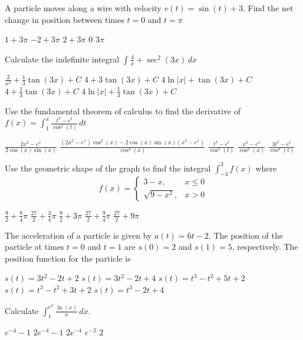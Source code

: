 \documentclass[11pt]{article}
\begin{document}
\begin{questions}
\begin{multiplechoice}{5}
\begin{questions}
\begin{multiplechoice}{5}
\begin{questions}
\begin{multiplechoice}{5}
\question A particle moves along a wire with velocity $v(t) = \sin(t) + 3$.  Find the
net change in position between times $t = 0$ and $t = \pi$
\begin{answers}{2}
\ans $1  + 3\pi$
\ans $-2 + 3\pi$
\ans $2 + 3\pi$
\ans $0$
\ans $3\pi$
\end{answers}

\question Calculate the indefinite integral 
$\displaystyle \int \frac{4}{x} + \sec^2(3x) \, dx$
\begin{answers}{2}
\ans $\frac{2}{x^2} + \frac{1}{3}\tan(3x) + C$
\ans $4 + 3 \tan(3x) + C$
\ans $4 \ln|x|  + \tan(3x) + C$
\ans $4  + \frac{1}{3}\tan(3x) + C$
\ans $4 \ln |x| + \frac{1}{3}\tan(3x) + C$
\end{answers}


\newpage

\question Use the fundamental theorem of calculus to find the derivative of 
$\displaystyle f(x) = \int_1^x \frac{t^3 - e^t}{\cos^2(t)} \, dt$
\begin{answers}{2}
\ans $\frac{2x^2 - e^x}{2 \cos(x) \sin(x)}$
\ans $\frac{(2x^2 - e^x)\cos^2(x) - 2 \cos(x) \sin(x) (x^3 - e^x)}{\cos^4(x)}$
\ans $\frac{t^4 - e^t}{\cos^2(t)}$
\ans $\frac{x^3 - e^x}{\cos^2(x)}$
\ans $\frac{3 t^2 - e^t}{\cos^4(t)}$
\end{answers}

\question Use the geometric shape of the graph to find the integral 
$\displaystyle \int_{-3}^3 f(x)$ where 
$$ f(x) = 
\begin{cases}
3 - x, & x \le 0 \\
\sqrt{9 - x^2}, & x > 0
\end{cases}
$$
\begin{answers}{2}
\ans $\frac{9}{2} + \frac{9}{4}\pi$
\ans $\frac{27}{2} + \frac{3}{4}\pi$
\ans $\frac{9}{2} + 3\pi$
\ans $\frac{27}{2} + \frac{9}{4}\pi$
\ans $\frac{27}{2} + 9\pi$
\end{answers}

\question The acceleration of a particle is given by $a(t) = 6t - 2$.  The position
of the particle at times $t = 0$ and $t = 1$ are $s(0) = 2$ and $s(1) = 5$, respectively.  
The position function for the particle is
\begin{answers}{2}
\ans $s(t) = 3t^2 - 2t + 2$
\ans $s(t) = 3t^2 - 2t + 4$
\ans $s(t) = t^3 - t^2 + 5t + 2$
\ans $s(t) = t^3 - t^2 + 3t + 2$
\ans $s(t) = t^3 - 2t + 4$
\end{answers}

\question Calculate $\int_1^{e^2} \frac{\ln(x)}{x} \, dx$.
\begin{answers}{2}
\ans $e^{-4} - 1$ 
\ans $2e^{-4} - 1$
\ans $2e^{-4}$
\ans $e^{-2}$
\ans $2$
\end{answers}


\end{multiplechoice}
\end{questions}
\end{multiplechoice}
\end{questions}
\end{multiplechoice}
\end{questions}
\end{document}
